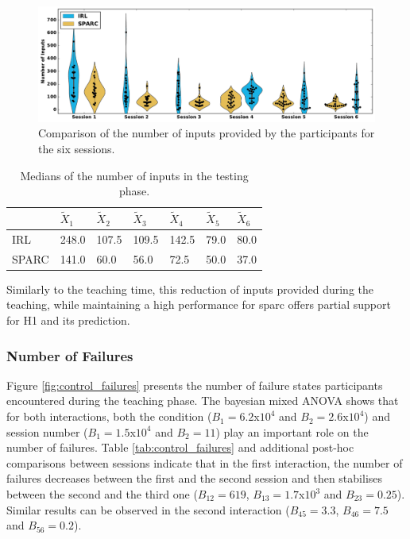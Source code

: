 \begin{figure}[ht]
	\includegraphics[width=\textwidth]{inputs.pdf}
	\centering
	\caption{Comparison of the number of inputs provided by the participants for the six sessions. 
	}
	\label{fig:control_inputs}
\end{figure}

\begin{table}[ht]
	\centering
	\caption{Medians of the number of inputs in the testing phase.}
	\label{tab:control_inputs}
	\begin{tabular}{@{}lllllll@{}} \toprule
		& $\widetilde{X}_{1}$ & $\widetilde{X}_{2}$ & $\widetilde{X}_{3}$ & $\widetilde{X}_{4}$ & $\widetilde{X}_{5}$ & $\widetilde{X}_{6}$\\ 
		\midrule
    IRL & 248.0 & 107.5 & 109.5 & 142.5 & 79.0 & 80.0\\
    SPARC & 141.0 & 60.0 & 56.0 & 72.5 & 50.0 & 37.0\\
    \bottomrule
	\end{tabular}
\end{table}

Similarly to the teaching time, this reduction of inputs provided during the teaching, while maintaining a high performance for \gls{sparc} offers partial support for H1 and its prediction.

\subsubsection{Number of Failures}

Figure \ref{fig:control_failures} presents the number of failure states participants encountered during the teaching phase. The bayesian mixed ANOVA shows that for both interactions, both the condition ($B_1=6.2$x$10^4$ and $B_2 = 2.6$x$10^4$) and session number ($B_1=1.5$x$10^4$ and $B_2 = 11$) play an important role on the number of failures. Table \ref{tab:control_failures} and additional post-hoc comparisons between sessions indicate that in the first interaction, the number of failures decreases between the first and the second session and then stabilises between the second and the third one ($B_{12}=619$, $B_{13}=1.7$x$10^3$ and $B_{23}=0.25$). Similar results can be observed in the second interaction ($B_{45}=3.3$, $B_{46}=7.5$ and $B_{56}=0.2$).

